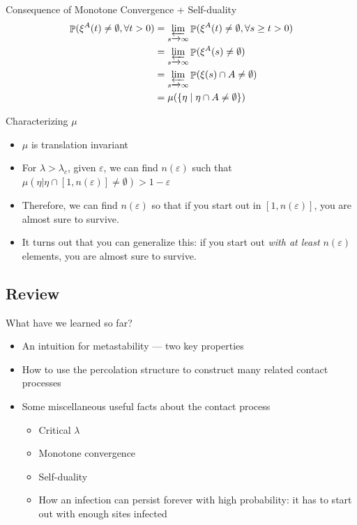 \documentclass{beamer}
\newcommand{\ep}{\varepsilon}
\begin{document}
\begin{frame}{Consequence of Monotone Convergence + Self-duality}
  \begin{align*}
    \Prob(\xi^{A}(t) \neq \emptyset, \forall t > 0) &= \limas_{s \to \infty} \Prob(\xi^{A}(t) \neq \emptyset, \forall s \geq t > 0) \\
                                 &= \limas_{s \to \infty} \Prob(\xi^{A}(s) \neq \emptyset) \\
                                 &= \limas_{s \to \infty} \Prob(\xi(s) \cap A \neq \emptyset) \\
                                 &= \mu(\set{\eta \st \eta \cap A \neq \emptyset})
  \end{align*}
\end{frame}

\begin{frame}{Characterizing $\mu$}
  \begin{itemize}
    \item $\mu$ is translation invariant
          \pause
    \item For $\lambda > \lambda_{c}$, given $\ep$, we can find $n(\ep)$ such that $\mu(\eta | \eta \cap [1,n(\ep)] \neq \emptyset) > 1 - \ep$
          \pause
    \item Therefore, we can find $n(\ep)$ so that if you start out in $[1,n(\ep)]$, you are almost sure to survive.
          \pause
    \item It turns out that you can generalize this: if you start out \emph{with at least $n(\ep)$} elements, you are almost sure to survive.
  \end{itemize}
\end{frame}

\subsection{Review}

\begin{frame}
  What have we learned so far?
  \begin{itemize}
    \item An intuition for metastability --- two key properties
          \pause
    \item How to use the percolation structure to construct many related contact processes
          \pause
    \item Some miscellaneous useful facts about the contact process
          \pause
          \begin{itemize}
            \item Critical $\lambda$
                  \pause
            \item Monotone convergence
                  \pause
            \item Self-duality
                  \pause
            \item How an infection can persist forever with high probability: it has to start out with enough sites infected
          \end{itemize}
  \end{itemize}
\end{frame}
\end{document}

